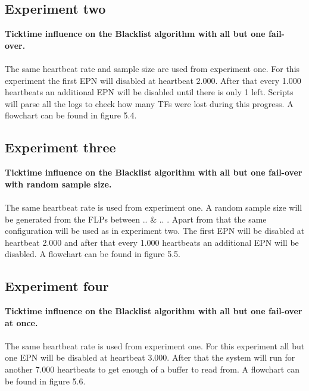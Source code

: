 
\subsection{Experiment two}
\textbf{Ticktime influence on the Blacklist algorithm with all but one fail-over.}
\\\\
The same heartbeat rate and sample size are used from experiment one. For this experiment the first EPN will disabled at heartbeat 2.000. After that every 1.000 heartbeats an additional EPN will be disabled until there is only 1 left. Scripts will parse all the logs to check how many TFs were lost during this progress. A flowchart can be found in figure 5.4.


\subsection{Experiment three}
\textbf{Ticktime influence on the Blacklist algorithm with all but one fail-over with random sample size.}
\\\\
The same heartbeat rate is used from experiment one. A random sample size will be generated from the FLPs between .. \& .. . Apart from that the same configuration will be used as in experiment two. The first EPN will be disabled at heartbeat 2.000 and after that every 1.000 heartbeats an additional EPN will be disabled. A flowchart can be found in figure 5.5.


\subsection{Experiment four}
\textbf{Ticktime influence on the Blacklist algorithm with all but one fail-over at once.}
\\\\
The same heartbeat rate is used from experiment one. For this experiment all but one EPN will be disabled at heartbeat 3.000. After that the system will run for another 7.000 heartbeats to get enough of a buffer to read from. A flowchart can be found in figure 5.6.